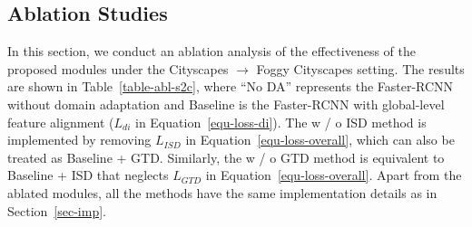 \documentclass[journal]{IEEEtran}
\begin{document}
\subsection{Ablation Studies}

In this section, we conduct an ablation analysis of the effectiveness of the proposed modules under the Cityscapes $\to$ Foggy Cityscapes setting. The results are shown in Table~\ref{table-abl-s2c}, where ``No DA'' represents the Faster-RCNN without domain adaptation and Baseline is the Faster-RCNN with global-level feature alignment ($L_{di}$ in Equation~\ref{equ-loss-di}). The w / o ISD method is implemented by removing $L_{ISD}$ in Equation~\ref{equ-loss-overall}, which can also be treated as Baseline + GTD. Similarly, the  w / o GTD method is equivalent to Baseline + ISD that neglects $L_{GTD}$ in Equation~\ref{equ-loss-overall}. Apart from the ablated modules, all the methods have the same implementation details as in Section~\ref{sec-imp}.


\begin{table*}[!htb]
\centering
\caption{Ablation studies for the GTD and ISD modules on the CityScapes $\to$ Foggy Cityscapes experiment.}
\label{table-abl-s2c}
\end{table*}
\end{document}
